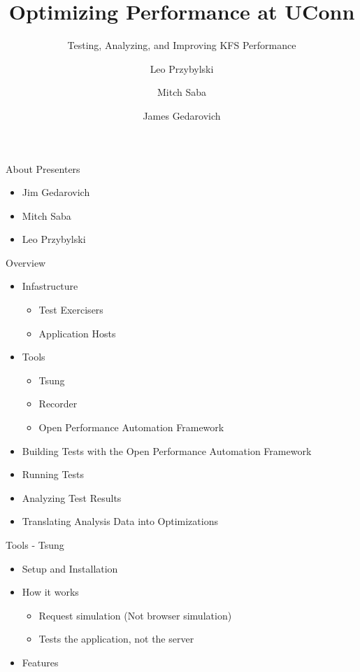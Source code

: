 \documentclass[xcolor=dvipsnames,14pt]{beamer}
\begin{document}
\title[A short proof]{Optimizing Performance at UConn}
\subtitle[Errors]{Testing, Analyzing, and Improving KFS Performance}
\author[Leo]{Leo Przybylski  \and Mitch Saba  \and James Gedarovich }



\begin{frame}[plain]
  \titlepage
\end{frame}

\begin{frame}{About Presenters}
  \begin{itemize}
    \item Jim Gedarovich
    \item Mitch Saba
    \item Leo Przybylski
  \end{itemize}
\end{frame}

\begin{frame}{Overview}
  \begin{itemize}
    \item Infastructure 
      \begin{itemize}
        \item Test Exercisers
        \item Application Hosts
      \end{itemize}
    \item Tools 
      \begin{itemize}
        \item Tsung
        \item Recorder
        \item Open Performance Automation Framework
      \end{itemize}
    \item Building Tests with the Open Performance Automation Framework
    \item Running Tests
    \item Analyzing Test Results
    \item Translating Analysis Data into Optimizations
  \end{itemize}
\end{frame}

\begin{frame}{Tools - Tsung}
  \begin{itemize}
    \item Setup and Installation
    \item How it works
      \begin{itemize}
        \item Request simulation (Not browser simulation)
        \item Tests the application, not the server
      \end{itemize}
    \item Features
  \end{itemize}
\end{frame}
\end{document}
